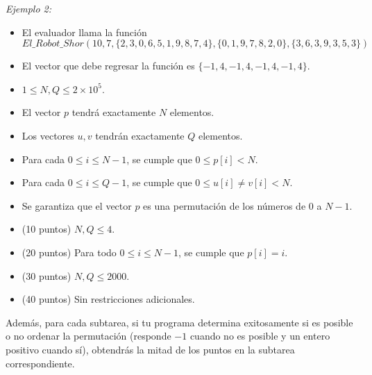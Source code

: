 \documentclass[12pt]{scrartcl}
\begin{document}
        {\itshape Ejemplo 2:}
        \begin{itemize}
            \item El evaluador llama la función $$El\_Robot\_Shor(10, 7, \{2, 3, 0, 6, 5, 1, 9, 8, 7, 4\}, \{0, 1, 9, 7, 8, 2, 0\}, \{3, 6, 3, 9, 3, 5, 3\})$$
            \item El vector que debe regresar la función es $\{-1, 4, -1, 4, -1, 4, -1, 4\}$.
        \end{itemize}
        
        \begin{itemize}
            \item $1 \le N, Q \le 2\times10^5$.
            \item El vector $p$ tendrá exactamente $N$ elementos.
            \item Los vectores $u, v$ tendrán exactamente $Q$ elementos.
            \item Para cada $0 \le i \le N - 1$, se cumple que $0 \le p[i] < N$. 
            \item Para cada $0 \le i \le Q - 1$, se cumple que $0 \le u[i] \neq v[i] < N$.
            \item Se garantiza que el vector $p$ es una permutación de los números de $0$ a $N - 1$.
        \end{itemize}
    

    \begin{itemize}
        \item (10 puntos) $N, Q \le 4$.
        \item (20 puntos) Para todo $0 \le i \le N - 1$, se cumple que $p[i] = i$.
        \item (30 puntos) $N, Q \le 2000$.
        \item (40 puntos) Sin restricciones adicionales.
    \end{itemize}
    Además, para cada subtarea, si tu programa determina exitosamente si es posible o no ordenar la permutación (responde $-1$ cuando no es posible y un entero positivo cuando sí), obtendrás la mitad de los puntos en la subtarea correspondiente. 
\end{document}
